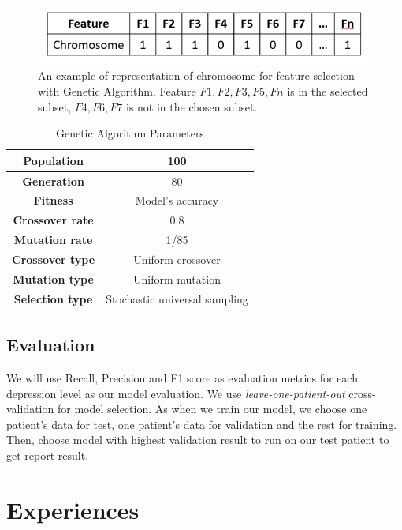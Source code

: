 \documentclass[runningheads]{llncs}
\begin{document}
\begin{figure}
    \centering
    \includegraphics[scale=0.5]{GA_feature.PNG}
    \caption{An example of representation of chromosome for feature selection with Genetic Algorithm. Feature $F1, F2, F3, F5, Fn$ is in the selected subset, $F4, F6,F7$ is not in the chosen subset.}
    \label{fig:ga_feature}
\end{figure}
\begin{table}[h]
    \centering
    \caption{Genetic Algorithm Parameters}
    \begin{tabular}{|c|c|}
        \hline
        \textbf{Population} & 100 \\
        \hline
        \textbf{Generation} & 80\\
        \hline
        \textbf{Fitness} & Model's accuracy \\
        \hline
        \textbf{Crossover rate} & 0.8\\
        \hline
        \textbf{Mutation rate} & 1/85\\
        \hline
        \textbf{Crossover type} & Uniform crossover\\
        \hline
        \textbf{Mutation type} & Uniform mutation\\
        \hline
        \textbf{Selection type} & Stochastic universal sampling\\
        \hline
    \end{tabular}
    \label{tab:ga}
\end{table}

\subsection{Evaluation}
We will use Recall, Precision and F1 score as evaluation metrics for each depression level as our model evaluation. We use \textit{leave-one-patient-out} cross-validation for model selection. As when we train our model, we choose one patient's data for test, one patient's data for validation and the rest for training. Then, choose model with highest validation result to run on our test patient to get report result.
\section{Experiences}
\end{document}
